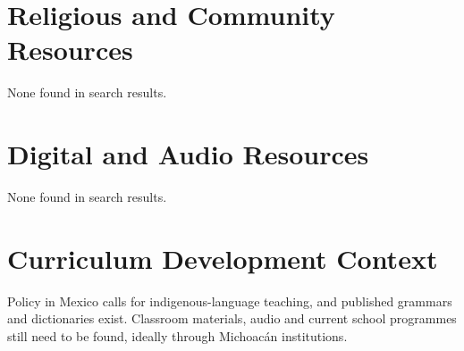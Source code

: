 \documentclass[12pt]{article}
\begin{document}
\section{Religious and Community Resources}
None found in search results.

\section{Digital and Audio Resources}
None found in search results.

\section{Curriculum Development Context}
Policy in Mexico calls for indigenous-language teaching, and published grammars and dictionaries exist. Classroom materials, audio and current school programmes still need to be found, ideally through Michoac\'an institutions.
\end{document}
